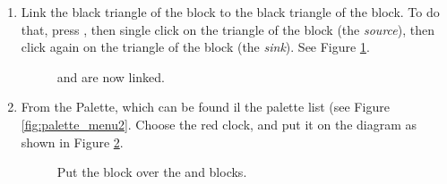 \begin{enumerate}
\item
  Link the black triangle of the  block to the black
  triangle of the  block. To do that, press , then
  single click on the triangle of the  block (the {\em
  source}), then click again on the triangle of the  block
  (the {\em sink}). See Figure \ref{fig:link}.
%
\begin{figure}[htb]
\caption{ and  are now linked.}
\label{fig:link}
\end{figure}

\item
  From the  Palette, which can be found il the
  palette list (see Figure \ref{fig:palette_menu2}. Choose the red
  clock, and put it on the diagram as shown in Figure \ref{fig:clock}.
%
\begin{figure}[htb]
\caption{Put the  block over the  and  blocks.}
\label{fig:clock}
\end{figure}


\end{enumerate}
